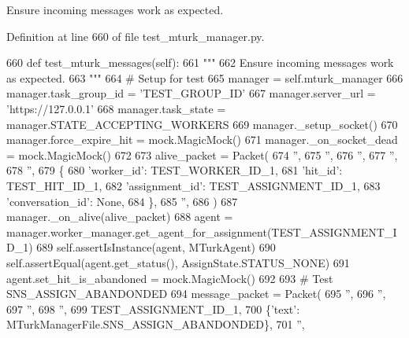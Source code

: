 \begin{DoxyVerb}Ensure incoming messages work as expected.
\end{DoxyVerb}
 

Definition at line 660 of file test\+\_\+mturk\+\_\+manager.\+py.


\begin{DoxyCode}
660     \textcolor{keyword}{def }test\_mturk\_messages(self):
661         \textcolor{stringliteral}{"""}
662 \textcolor{stringliteral}{        Ensure incoming messages work as expected.}
663 \textcolor{stringliteral}{        """}
664         \textcolor{comment}{# Setup for test}
665         manager = self.mturk\_manager
666         manager.task\_group\_id = \textcolor{stringliteral}{'TEST\_GROUP\_ID'}
667         manager.server\_url = \textcolor{stringliteral}{'https://127.0.0.1'}
668         manager.task\_state = manager.STATE\_ACCEPTING\_WORKERS
669         manager.\_setup\_socket()
670         manager.force\_expire\_hit = mock.MagicMock()
671         manager.\_on\_socket\_dead = mock.MagicMock()
672 
673         alive\_packet = Packet(
674             \textcolor{stringliteral}{''},
675             \textcolor{stringliteral}{''},
676             \textcolor{stringliteral}{''},
677             \textcolor{stringliteral}{''},
678             \textcolor{stringliteral}{''},
679             \{
680                 \textcolor{stringliteral}{'worker\_id'}: TEST\_WORKER\_ID\_1,
681                 \textcolor{stringliteral}{'hit\_id'}: TEST\_HIT\_ID\_1,
682                 \textcolor{stringliteral}{'assignment\_id'}: TEST\_ASSIGNMENT\_ID\_1,
683                 \textcolor{stringliteral}{'conversation\_id'}: \textcolor{keywordtype}{None},
684             \},
685             \textcolor{stringliteral}{''},
686         )
687         manager.\_on\_alive(alive\_packet)
688         agent = manager.worker\_manager.get\_agent\_for\_assignment(TEST\_ASSIGNMENT\_ID\_1)
689         self.assertIsInstance(agent, MTurkAgent)
690         self.assertEqual(agent.get\_status(), AssignState.STATUS\_NONE)
691         agent.set\_hit\_is\_abandoned = mock.MagicMock()
692 
693         \textcolor{comment}{# Test SNS\_ASSIGN\_ABANDONDED}
694         message\_packet = Packet(
695             \textcolor{stringliteral}{''},
696             \textcolor{stringliteral}{''},
697             \textcolor{stringliteral}{''},
698             \textcolor{stringliteral}{''},
699             TEST\_ASSIGNMENT\_ID\_1,
700             \{\textcolor{stringliteral}{'text'}: MTurkManagerFile.SNS\_ASSIGN\_ABANDONDED\},
701             \textcolor{stringliteral}{''},

\end{DoxyCode}
